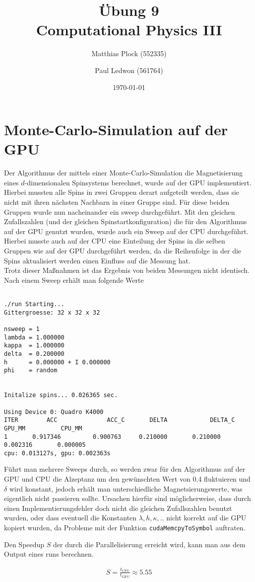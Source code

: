\documentclass[10pt,a4paper]{article}
\title{Übung 9 \\Computational Physics III}
\author{Matthias Plock (552335) \and Paul Ledwon (561764)} %
\date{\today}
\begin{document}
\maketitle
\tableofcontents

\pagestyle{myheadings}                  %

\section{Monte-Carlo-Simulation auf der GPU}

Der Algorithmus der mittels einer Monte-Carlo-Simulation die 
Magnetisierung eines $d$-dimensionalen Spinsystems berechnet, 
wurde auf der GPU implementiert. Hierbei mussten alle Spins in zwei 
Gruppen derart aufgeteilt werden, dass sie nicht mit ihren nächsten 
Nachbarn in einer Gruppe sind. Für diese beiden Gruppen wurde nun 
nacheinander ein sweep durchgeführt. Mit den gleichen Zufallszahlen 
(und der gleichen Spinstartkonfiguration) die für den Algorithmus auf der GPU genutzt wurden, wurde auch ein Sweep auf der CPU durchgeführt.
Hierbei musste auch auf der CPU eine Einteilung der Spins in die selben
Gruppen wie auf der GPU durchgeführt werden, da die Reihenfolge in 
der die Spins aktualisiert werden einen Einfluss auf die Messung hat.\\

Trotz dieser Maßnahmen ist das Ergebnis von beiden Messungen nicht identisch. Nach einem Sweep erhält man folgende Werte 

\begin{verbatim}

./run Starting...
Gittergroesse: 32 x 32 x 32

nsweep = 1
lambda = 1.000000
kappa  = 1.000000
delta  = 0.200000
h      = 0.000000 + I 0.000000
phi    = random


Initalize spins... 0.026365 sec.

Using Device 0: Quadro K4000
ITER 	    ACC              ACC_C 	     DELTA            DELTA_C 	      GPU_MM 	      CPU_MM
1 	    0.917346         0.900763     0.210000 	     0.210000 	    0.002316 	   0.000005 
cpu: 0.013127s, gpu: 0.002363s
\end{verbatim}


Führt man mehrere Sweeps durch, so werden zwar für den Algorithmus 
auf der GPU und CPU die Alzeptanz um den gewünschten Wert von 0.4 
fluktuieren und $\delta$ wird konstant, jedoch erhält man 
unterschiedliche Magnetsierungswerte, was eigentlich nicht passieren sollte. Ursachen hierfür sind möglicherweise, dass durch einen 
Implementierungsfehler doch nicht die gleichen Zufallszahlen benutzt 
wurden, oder dass eventuell die Konstanten $\lambda, h, \kappa, ..$ 
nicht korrekt auf die GPU kopiert wurden, da Probleme mit der Funktion
\texttt{cudaMemcpyToSymbol} auftraten.

Den Speedup $S$ der durch die Parallelisierung erreicht wird, kann man aus dem Output eines runs berechnen.  

\begin{align*}
  S = \frac{t_\text{CPU}}{t_\text{GPU}} \approx 5.55 
\end{align*}
\end{document}
